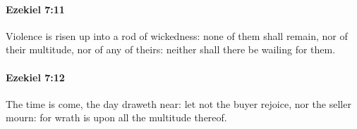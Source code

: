 		\paragraph{Ezekiel 7:11} %
			\label{EZEKIEL-7-11}

			Violence is risen up into a rod of wickedness: none of them shall remain, nor of their multitude, nor of any of theirs: neither shall there be wailing for them.


		\paragraph{Ezekiel 7:12} %
			\label{EZEKIEL-7-12}

			The time is come, the day draweth near: let not the buyer rejoice, nor the seller mourn: for wrath is upon all the multitude thereof.


